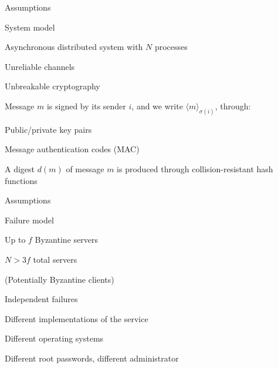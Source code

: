 \begin{frame}{Assumptions}
\BIL
\item System model
	\BI
	\item Asynchronous distributed system with $N$ processes
	\item Unreliable channels
	\EI
\item Unbreakable cryptography
	\BI
	\item Message $m$ is signed by its sender $i$, and we write $\langle m \rangle_{\sigma(i)}$, through:
		\BI
		\item Public/private key pairs 
		\item Message authentication codes (MAC)
		\EI
	\item A digest $d(m)$ of message $m$ is produced through collision-resistant hash functions
	\EI
\EIL
\end{frame}


\begin{frame}{Assumptions}
\BIL

\item Failure model
\BI
\item Up to $f$ Byzantine servers
\item $N > 3f$ total servers
\item (Potentially Byzantine clients)
\EI
\item Independent failures
\BI
\item  Different implementations of the service
\item Different operating systems
\item Different root passwords, different administrator
\EI

\EIL

\end{frame}


